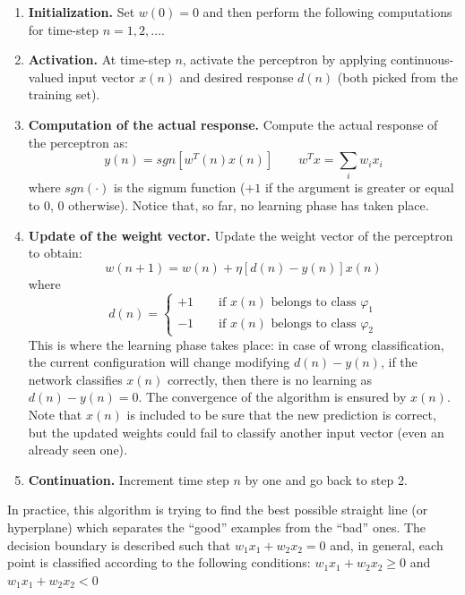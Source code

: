 \begin{enumerate}

	\item \textbf{Initialization.} Set $w(0) = 0$ and then perform the following computations for time-step $n=1,2,\dots$.
 
	\item \textbf{Activation.} At time-step $n$, activate the perceptron by applying continuous-valued input vector $x(n)$ and desired response $d(n)$ (both picked from the training set).
 
	\item \textbf{Computation of the actual response.} Compute the actual response of the perceptron as:
	$$y(n) = sgn[w^T(n)x(n)] \qquad w^Tx = \sum_iw_ix_i$$
	where $sgn(\cdot)$ is the signum function ($+1$ if the argument is greater or equal to $0$, $0$ otherwise). Notice that, so far, no learning phase has taken place.
 
	\item \textbf{Update of the weight vector.} Update the weight vector of the perceptron to obtain:
	$$w(n+1) = w(n) + \eta[d(n) - y(n)]x(n)$$
	where
	$$d(n) = 
	\begin{cases}
	+1 \qquad \text{if } x(n) \text{ belongs to class } \varphi_1\\
	-1 \qquad \text{if } x(n) \text{ belongs to class } \varphi_2 
	\end{cases}$$
	This is where the learning phase takes place: in case of wrong classification, the current configuration will change modifying $d(n) - y(n)$, if the network classifies $x(n)$ correctly, then there is no learning as $d(n)-y(n) = 0$. The convergence of the algorithm is ensured by $x(n)$. Note that $x(n)$ is included to be sure that the new prediction is correct, but the updated weights could fail to classify another input vector (even an already seen one).
 
	\item \textbf{Continuation.} Increment time step $n$ by one and go back to step 2.
 
\end{enumerate}

In practice, this algorithm is trying to find the best possible straight line (or hyperplane) which separates the ``good'' examples from the ``bad'' ones. The decision boundary is described such that $w_1x_1 + w_2x_2 = 0$ and, in general, each point is classified according to the following conditions:  $w_1x_1 + w_2x_2 \geq 0$ and $w_1x_1 + w_2x_2 < 0$

